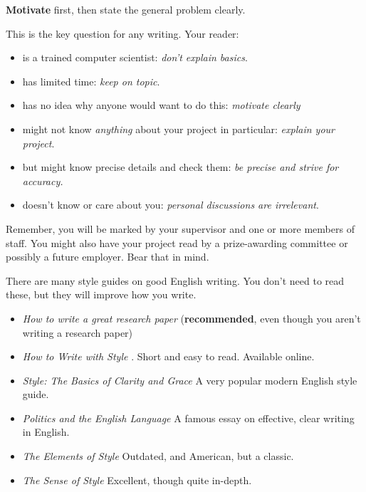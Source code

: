 \documentclass{l4proj}
\begin{document}
\textbf{Motivate} first, then state the general problem clearly. 


This is the key question for any writing. Your reader:

\begin{itemize}
    \item
    is a trained computer scientist: \emph{don't explain basics}.
    \item
    has limited time: \emph{keep on topic}.
    \item
    has no idea why anyone would want to do this: \emph{motivate clearly}
    \item
    might not know \emph{anything} about your project in particular:
    \emph{explain your project}.
    \item
    but might know precise details and check them: \emph{be precise and
    strive for accuracy.}
    \item
    doesn't know or care about you: \emph{personal discussions are
    irrelevant}.
\end{itemize}

Remember, you will be marked by your supervisor and one or more members
of staff. You might also have your project read by a prize-awarding
committee or possibly a future employer. Bear that in mind.

There are many style guides on good English writing. You don't need to
read these, but they will improve how you write.

\begin{itemize}
    \item
    \emph{How to write a great research paper} \cite{Pey17} (\textbf{recommended}, even though you aren't writing a research paper)
    \item
    \emph{How to Write with Style} \cite{Von80}. Short and easy to read. Available online.
    \item
    \emph{Style: The Basics of Clarity and Grace} \cite{Wil09} A very popular modern English style guide.
    \item
    \emph{Politics and the English Language} \cite{Orw68}  A famous essay on effective, clear writing in English.
    \item
    \emph{The Elements of Style} \cite{StrWhi07} Outdated, and American, but a classic.
    \item
    \emph{The Sense of Style} \cite{Pin15} Excellent, though quite in-depth.
\end{itemize}
\end{document}
